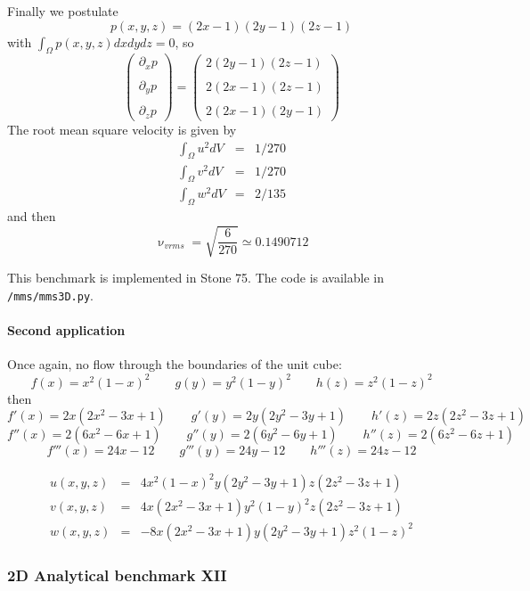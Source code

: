 Finally we postulate 
\[
p(x,y,z) = (2x-1)(2y-1)(2z-1)
\]
with $\int_\Omega p(x,y,z) dx dy dz =0$, so
\[ 
\left(
\begin{array}{c}
\partial_x p \\ \\
\partial_y p \\ \\
\partial_z p 
\end{array}
\right) 
=
\left(
\begin{array}{c}
2(2y-1)(2z-1) \\\\
2(2x-1)(2z-1) \\\\
2(2x-1)(2y-1) 
\end{array}
\right) 
\]
The root mean square velocity is given by 
\begin{eqnarray}
\int_\Omega u^2 dV &=& 1/270 \\
\int_\Omega v^2 dV &=& 1/270 \\
\int_\Omega w^2 dV &=& 2/135
\end{eqnarray}
and then 
\[
\upnu_{vrms} =\sqrt{\frac{6}{270}} \simeq 0.1490712
\]

This benchmark is implemented in Stone 75. The code is available in {\tt /mms/mms3D.py}.

\paragraph{Second application}

Once again, no flow through the boundaries of the unit cube:
\[
f(x)=x^2(1-x)^2 \qquad
g(y)=y^2(1-y)^2 \qquad
h(z)=z^2(1-z)^2 
\]
then 
\[
f'(x)=2x(2x^2-3x+1) \qquad
g'(y)=2y(2y^2-3y+1) \qquad
h'(z)=2z(2z^2-3z+1) 
\]
\[
f''(x)=2(6x^2-6x+1) \qquad
g''(y)=2(6y^2-6y+1) \qquad
h''(z)=2(6z^2-6z+1)
\]
\[
f'''(x)=24x-12 \qquad
g'''(y)=24y-12 \qquad
h'''(z)=24z-12
\]

\begin{eqnarray}
u(x,y,z) &=& 4 x^2(1-x)^2  y(2y^2-3y+1) z(2z^2-3z+1)  \\
v(x,y,z) &=& 4 x(2x^2-3x+1) y^2(1-y)^2 z(2z^2-3z+1) \\
w(x,y,z) &=& -8 x(2x^2-3x+1) y(2y^2-3y+1) z^2(1-z)^2 
\end{eqnarray}
\subsubsection{2D Analytical benchmark XII}\label{ss:sofo87_2D}

